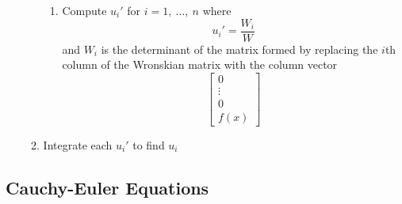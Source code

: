 \documentclass{article}
\begin{document}
\begin{itemize}
\begin{enumerate}
\begin{enumerate}
                  \item Compute $u_i'$ for $i = 1, \: \ldots, \: n$ where \[u_i' = \frac{W_i}{W}\] and $W_i$ is the determinant of the matrix formed by replacing the $i$th column of the Wronskian matrix with the column vector \[\begin{bmatrix}
                            0      \\
                            \vdots \\
                            0      \\
                            f(x)
                          \end{bmatrix}\]
                \end{enumerate}

          \item Integrate each $u_i'$ to find $u_i$
        \end{enumerate}
\end{itemize}

\subsection{Cauchy-Euler Equations}
\end{document}
